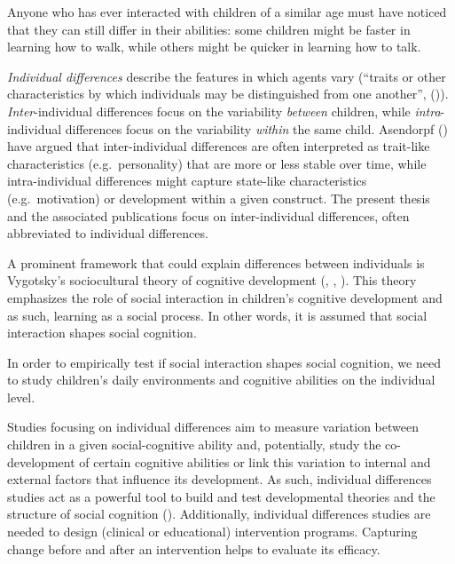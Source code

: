 \documentclass[
]{scrbook}
\begin{document}
Anyone who has ever interacted with children of a similar age must have noticed that they can still differ in their abilities: some children might be faster in learning how to walk, while others might be quicker in learning how to talk.

\emph{Individual differences} describe the features in which agents vary (``traits or other characteristics by which individuals may be distinguished from one another'', ()). \emph{Inter}-individual differences focus on the variability \emph{between} children, while \emph{intra}-individual differences focus on the variability \emph{within} the same child. Asendorpf () have argued that inter-individual differences are often interpreted as trait-like characteristics (e.g.~personality) that are more or less stable over time, while intra-individual differences might capture state-like characteristics (e.g.~motivation) or development within a given construct. The present thesis and the associated publications focus on inter-individual differences, often abbreviated to individual differences.

A prominent framework that could explain differences between individuals is Vygotsky's sociocultural theory of cognitive development (, , ). This theory emphasizes the role of social interaction in children's cognitive development and as such, learning as a social process. In other words, it is assumed that social interaction shapes social cognition.

In order to empirically test if social interaction shapes social cognition, we need to study children's daily environments and cognitive abilities on the individual level.

Studies focusing on individual differences aim to measure variation between children in a given social-cognitive ability and, potentially, study the co-development of certain cognitive abilities or link this variation to internal and external factors that influence its development. As such, individual differences studies act as a powerful tool to build and test developmental theories and the structure of social cognition (). Additionally, individual differences studies are needed to design (clinical or educational) intervention programs. Capturing change before and after an intervention helps to evaluate its efficacy.
\end{document}
